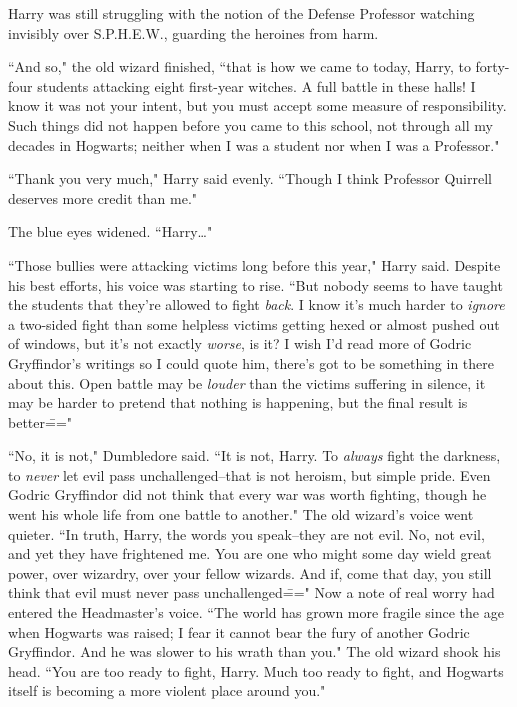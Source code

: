 Harry was still struggling with the notion of the Defense Professor watching invisibly over S.P.H.E.W., guarding the heroines from harm.

``And so," the old wizard finished, ``that is how we came to today, Harry, to forty-four students attacking eight first-year witches. A full battle in these halls! I know it was not your intent, but you must accept some measure of responsibility. Such things did not happen before you came to this school, not through all my decades in Hogwarts; neither when I was a student nor when I was a Professor."

``Thank you very much," Harry said evenly. ``Though I think Professor Quirrell deserves more credit than me."

The blue eyes widened. ``Harry{\ldots}"

``Those bullies were attacking victims long before this year," Harry said. Despite his best efforts, his voice was starting to rise. ``But nobody seems to have taught the students that they're allowed to fight \emph{back}. I know it's much harder to \emph{ignore} a two-sided fight than some helpless victims getting hexed or almost pushed out of windows, but it's not exactly \emph{worse}, is it? I wish I'd read more of Godric Gryffindor's writings so I could quote him, there's got to be something in there about this. Open battle may be \emph{louder} than the victims suffering in silence, it may be harder to pretend that nothing is happening, but the final result is better\==="

``No, it is not," Dumbledore said. ``It is not, Harry. To \emph{always} fight the darkness, to \emph{never} let evil pass unchallenged\---that is not heroism, but simple pride. Even Godric Gryffindor did not think that every war was worth fighting, though he went his whole life from one battle to another." The old wizard's voice went quieter. ``In truth, Harry, the words you speak\---they are not evil. No, not evil, and yet they have frightened me. You are one who might some day wield great power, over wizardry, over your fellow wizards. And if, come that day, you still think that evil must never pass unchallenged\===" Now a note of real worry had entered the Headmaster's voice. ``The world has grown more fragile since the age when Hogwarts was raised; I fear it cannot bear the fury of another Godric Gryffindor. And he was slower to his wrath than you." The old wizard shook his head. ``You are too ready to fight, Harry. Much too ready to fight, and Hogwarts itself is becoming a more violent place around you."

